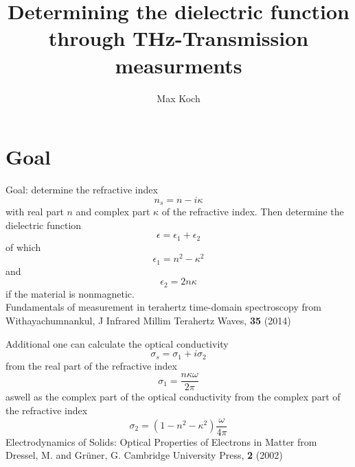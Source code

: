\documentclass[aspectratio=1610, 9pt]{beamer}
\title{Determining the dielectric function through THz-Transmission measurments}
\author[M.~Koch]{Max Koch}
\institute[AG Wang]{Group Wang \\  faculty Physics}
\begin{document}
\maketitle

\section{Goal}
\begin{frame}
Goal: determine the refractive index \
\begin{equation}
  n_s = n - i\kappa
\end{equation}
with real part $n$ and complex part $\kappa$ of the refractive index.
Then determine the dielectric function 
\begin{equation}
  \epsilon = \epsilon_1 + \epsilon_2
\end{equation}
of which
\begin{equation}
  \epsilon_1 = n^2 - \kappa^2
\end{equation}
and 
\begin{equation}
  \epsilon_2  = 2n\kappa 
\end{equation}
if the material is nonmagnetic.\\
\textcolor{tugreen}{Fundamentals of measurement in terahertz time-domain spectroscopy} from Withayachumnankul, J Infrared Millim Terahertz Waves, \textbf{35} (2014) 
\end{frame}

\begin{frame}
  Additional one can calculate the optical conductivity \
  \begin{equation}
    \sigma_s  = \sigma_1 + i \sigma_2 
  \end{equation}
  from the real part of the refractive index 
  \begin{equation}
    \sigma_1 = \frac{n \kappa \omega}{2\pi}
  \end{equation}
  aswell as the complex part of the optical conductivity from the complex part of the refractive index
  \begin{equation}
    \sigma_2 = \left( 1 - n^2 - \kappa^2\right) \frac{\omega}{4\pi}
  \end{equation}
  \textcolor{tugreen}{Electrodynamics of Solids: Optical Properties of Electrons in Matter} from Dressel, M. and Grüner, G. Cambridge University Press, \textbf{2} (2002) 
\end{frame}
\end{document}
